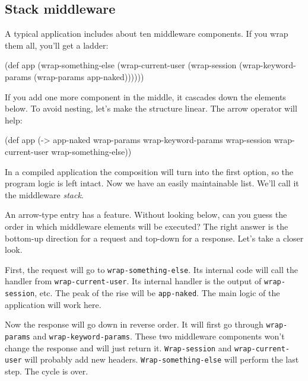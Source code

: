 \subsection{Stack middleware}

A typical application includes about ten middleware components. If you wrap them all, you'll get a ladder:

\begin{english}
  \begin{clojure}
(def app
  (wrap-something-else
    (wrap-current-user
      (wrap-session
        (wrap-keyword-params
          (wrap-params app-naked))))))
  \end{clojure}
\end{english}


If you add one more component in the middle, it cascades down the elements below. To avoid nesting, let's make the structure linear. The arrow operator will help:


\begin{english}
  \begin{clojure/lines}
(def app
  (-> app-naked
      wrap-params
      wrap-keyword-params
      wrap-session
      wrap-current-user
      wrap-something-else))
  \end{clojure/lines}
\end{english}


In a compiled application the composition will turn into the first option, so the program logic is left intact. Now we have an easily maintainable list. We'll call it
the middleware \emph{stack}.

An arrow-type entry has a feature. Without looking below, can you guess the order in which middleware elements will be executed? The right answer is the bottom-up direction for a request and top-down for a response. Let's take a closer look.


First, the request will go to \verb|wrap-something-else|. Its internal code will call the handler from \verb|wrap-current-user|. Its internal handler is the output of \verb|wrap-session|, etc. The peak of the rise will be \verb|app-naked|. The main logic of the application will work here.

Now the response will go down in reverse order. It will first go through \verb|wrap-params| and \verb|wrap-keyword-params|. These two middleware components won't change the response and will just return it. \verb|Wrap-session| and \verb|wrap-current-user| will probably add new headers. \verb|Wrap-something-else| will perform the last step. The cycle is over.

